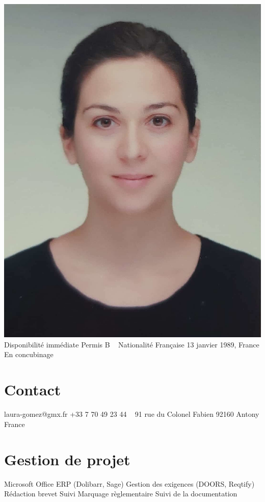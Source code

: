\documentclass{cv-style}     %
\begin{document}


\begin{aside}
    \includegraphics[width=.8\columnwidth]{img/LG}
    {\color{gray} \faFlask}Disponibilité immédiate
    {\color{gray} \faFlask}Permis B
    ~
    Nationalité Française
    13 janvier 1989, France
    En concubinage
    \section{Contact}
    laura-gomez@gmx.fr
    +33 7 70 49 23 44
    ~
    91 rue du Colonel Fabien
    92160 Antony
    France
    \section{Gestion de projet}
    Microsoft Office
    ERP (Dolibarr, Sage)
    Gestion des exigences (DOORS, Reqtify)
    ~
    Rédaction brevet
    Suivi Marquage règlementaire
    Suivi de la documentation

\end{aside}
\end{document}
